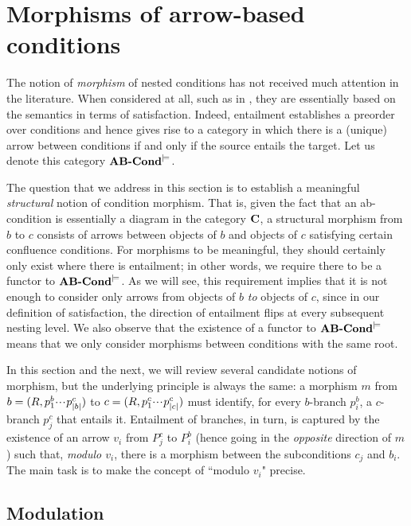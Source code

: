 \section{Morphisms of arrow-based conditions}

The notion of \emph{morphism} of nested conditions has not received much attention in the literature. When considered at all, such as in \cite{Koenig-morphism}, they are essentially based on the semantics in terms of satisfaction. Indeed, entailment establishes a preorder over conditions and hence gives rise to a category in which there is a (unique) arrow between conditions if and only if the source entails the target.  Let us denote this category $\textbf{AB-Cond}^{\models}$.

The question that we address in this section is to establish a meaningful \emph{structural} notion of condition morphism. That is, given the fact that an ab-condition is essentially a diagram in the category $\mathbf{C}$, a structural morphism from $b$ to $c$ consists of arrows between objects of $b$ and objects of $c$ satisfying certain confluence conditions. For morphisms to be meaningful, they should certainly only exist where there is entailment; in other words, we require there to be a functor to $\textbf{AB-Cond}^{\models}$. As we will see, this requirement implies that it is not enough to consider only arrows from objects of $b$ \emph{to} objects of $c$, since in our definition of satisfaction, the direction of entailment flips at every subsequent nesting level. We also observe that the existence of a functor to $\textbf{AB-Cond}^{\models}$ means that we only consider morphisms between conditions with the same root.

In this section and the next, we will review several candidate notions of morphism, but the underlying principle is always the same: a morphism $m$ from $b=(R,p^b_1{\cdotp\mkern-2mu\cdotp\mkern-2mu\cdotp\mkern1mu} p^c_{|b|})$ to $c=(R,p^c_1{\cdotp\mkern-2mu\cdotp\mkern-2mu\cdotp\mkern1mu} p^c_{|c|})$ must identify, for every $b$-branch $p^b_i$, a $c$-branch $p^c_j$ that entails it. Entailment of branches, in turn, is captured by the existence of an arrow $v_i$ from $P^c_j$ to $P^b_i$ (hence going in the \emph{opposite} direction of $m$) such that, \emph{modulo $v_i$}, there is a morphism between the subconditions $c_j$ and $b_i$. The main task is to make the concept of ``modulo $v_i$" precise.

\subsection{Modulation}

